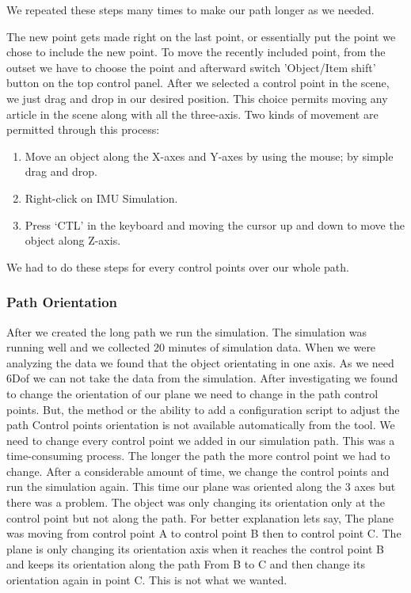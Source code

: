 We repeated these steps many times to make our path longer as we needed. 

The new point gets made right on the last point, or essentially put the point we chose to include the new point. To move the recently included point, from the outset we have to choose the point and afterward switch 'Object/Item shift' button on the top control panel. After we selected a control point in the scene, we just drag and drop in our desired position. This choice permits moving any article in the scene along with all the three-axis. Two kinds of movement are permitted through this process:

\begin{enumerate}
  \item Move an object along the X-axes and Y-axes by using the mouse; by simple drag and drop.
  \item Right-click on IMU Simulation.
  \item Press ‘CTL’ in the keyboard and moving the cursor up and down to move the object along Z-axis.
\end{enumerate}

We had to do these steps for every control points over our whole path.


\subsubsection{Path Orientation}

After we created the long path we run the simulation. The simulation was running well and we collected 20 minutes of simulation data. When we were analyzing the data we found that the object orientating in one axis. As we need 6Dof we can not take the data from the simulation. 
After investigating we found to change the orientation of our plane we need to change in the path control points. But, the method or the ability to add a configuration script to adjust the path Control points orientation is not available automatically from the tool. We need to change every control point we added in our simulation path. This was a time-consuming process. The longer the path the more control point we had to change. After a considerable amount of time, we change the control points and run the simulation again. This time our plane was oriented along the 3 axes but there was a problem. The object was only changing its orientation only at the control point but not along the path. For better explanation lets say, The plane was moving from control point A to control point B then to control point C. The plane is only changing its orientation axis when it reaches the control point B and keeps its orientation along the path From B to C and then change its orientation again in point C. This is not what we wanted.

